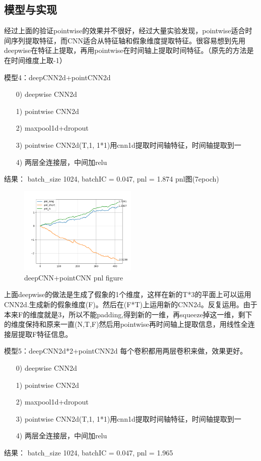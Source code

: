 \documentclass[11pt]{ctexart}
\begin{document}
\subsection{模型与实现}
经过上面的验证pointwise的效果并不很好，经过大量实验发现，pointwise适合时间序列提取特征，而CNN适合从特征轴和假象维度提取特征。很容易想到先用deepwise在特征上提取，再用pointwise在时间轴上提取时间特征。（原先的方法是在时间维度上取-1）

模型4：deepCNN2d+pointCNN2d
\begin{itemize}
  \item [0)]
  deepwise CNN2d
  \item [1)]
  pointwise CNN2d
  \item [2)]
  maxpool1d+dropout
  \item [3)]
  pointwise CNN2d(T,1, 1*1)用cnn1d提取时间轴特征，时间轴提取到一
  \item [4)]
  两层全连接层，中间加relu

\end{itemize}
结果： batch\_size 1024, batchIC = 0.047, pnl = 1.874
pnl图(7epoch)
\begin{figure}[!ht]
\begin{center}
\includegraphics[width=0.5\textwidth]{3.PNG}
\end{center}
\caption{deepCNN+pointCNN pnl figure}
\label{FIG.4}
\end{figure}

上面deepwise的做法是生成了假象的1个维度，这样在新的T*3的平面上可以运用CNN2d.生成新的假象维度(F)。然后在(F*T)上运用新的CNN2d。反复运用。由于本来F的维度就是3，所以不能padding,得到新的一维，再squeeze掉这一维，剩下的维度保持和原来一直(N,T,F)然后用pointwise再时间轴上提取信息，用线性全连接层提取F特征信息。

模型5：deepCNN2d*2+pointCNN2d
每个卷积都用两层卷积来做，效果更好。
\begin{itemize}
  \item [0)]
  deepwise CNN2d
  \item [1)]
  pointwise CNN2d
  \item [2)]
  maxpool1d+dropout
  \item [3)]
  pointwise CNN2d(T,1, 1*1)用cnn1d提取时间轴特征，时间轴提取到一
  \item [4)]
  两层全连接层，中间加relu

\end{itemize}
结果： batch\_size 1024, batchIC = 0.047, pnl = 1.965
\end{document}
